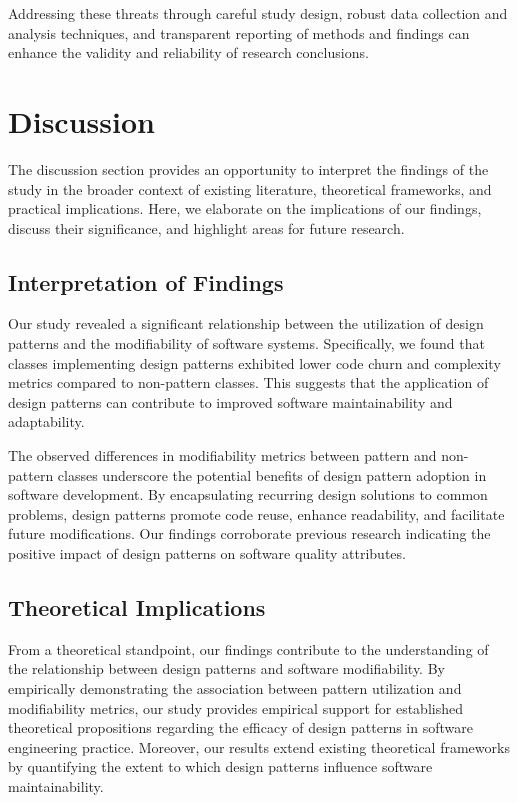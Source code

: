 \documentclass[conference]{IEEEtran}
\begin{document}
	Addressing these threats through careful study design, robust data collection and analysis techniques, and transparent reporting of methods and findings can enhance the validity and reliability of research conclusions.
	
	\section{Discussion}
	
	The discussion section provides an opportunity to interpret the findings of the study in the broader context of existing literature, theoretical frameworks, and practical implications. Here, we elaborate on the implications of our findings, discuss their significance, and highlight areas for future research.
	
	\subsection{Interpretation of Findings}
	
	Our study revealed a significant relationship between the utilization of design patterns and the modifiability of software systems. Specifically, we found that classes implementing design patterns exhibited lower code churn and complexity metrics compared to non-pattern classes. This suggests that the application of design patterns can contribute to improved software maintainability and adaptability.
	
	The observed differences in modifiability metrics between pattern and non-pattern classes underscore the potential benefits of design pattern adoption in software development. By encapsulating recurring design solutions to common problems, design patterns promote code reuse, enhance readability, and facilitate future modifications. Our findings corroborate previous research indicating the positive impact of design patterns on software quality attributes.
	
	\subsection{Theoretical Implications}
	
	From a theoretical standpoint, our findings contribute to the understanding of the relationship between design patterns and software modifiability. By empirically demonstrating the association between pattern utilization and modifiability metrics, our study provides empirical support for established theoretical propositions regarding the efficacy of design patterns in software engineering practice. Moreover, our results extend existing theoretical frameworks by quantifying the extent to which design patterns influence software maintainability.
	
\end{document}
